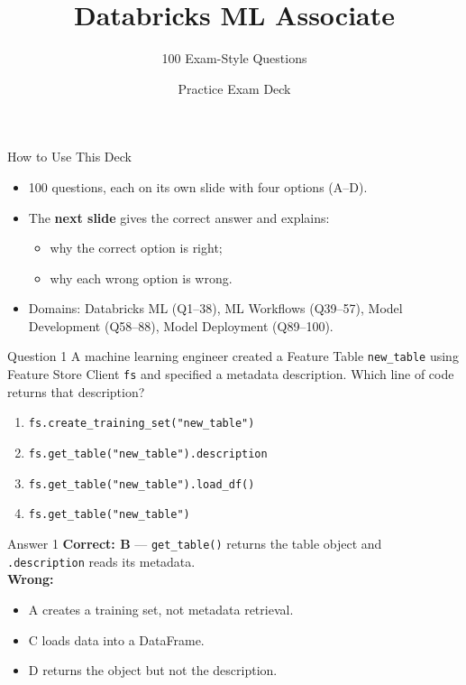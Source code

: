 \documentclass[aspectratio=169,11pt]{beamer}
\title{Databricks ML Associate}
\subtitle{100 Exam-Style Questions}
\author{Practice Exam Deck}
\date{}
\begin{document}
	
	\begin{frame}
		\titlepage
	\end{frame}
	
	\begin{frame}{How to Use This Deck}
		\begin{itemize}
			\item 100 questions, each on its own slide with four options (A--D).
			\item The \textbf{next slide} gives the correct answer and explains:
			\begin{itemize}
				\item why the correct option is right;
				\item why each wrong option is wrong.
			\end{itemize}
			\item Domains: Databricks ML (Q1--38), ML Workflows (Q39--57), Model Development (Q58--88), Model Deployment (Q89--100).
		\end{itemize}
	\end{frame}
	
	\begin{frame}{Question 1}
		A machine learning engineer created a Feature Table \texttt{new\_table} using Feature Store Client \texttt{fs} and specified a metadata description. Which line of code returns that description?
		\begin{enumerate}[label=\Alph*.]
			\item \texttt{fs.create\_training\_set("new\_table")}
			\item \texttt{fs.get\_table("new\_table").description}
			\item \texttt{fs.get\_table("new\_table").load\_df()}
			\item \texttt{fs.get\_table("new\_table")}
		\end{enumerate}
	\end{frame}
	\begin{frame}{Answer 1}
		\textbf{Correct: B} --- \texttt{get\_table()} returns the table object and \texttt{.description} reads its metadata.\\
		\vspace{0.5em}
		\textbf{Wrong:}
		\begin{itemize}
			\item A creates a training set, not metadata retrieval.
			\item C loads data into a DataFrame.
			\item D returns the object but not the description.
		\end{itemize}
	\end{frame}
	
\end{document}
